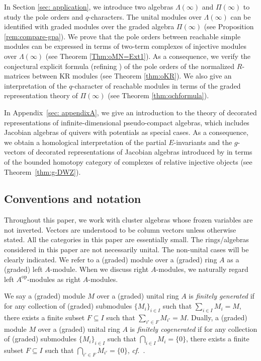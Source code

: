 \documentclass[12pt]{amsart}
\theoremstyle{definition}
\theoremstyle{remark}
\numberwithin{equation}{section}
\newcommand{\confer}{\textit{cf.}\ }
\newcommand{\op}{\mathrm{op}}
\begin{document}
In Section \ref{sec: application}, we introduce two algebras $\Lambda(\infty)$ and $\Pi(\infty)$ to study the pole orders and $q$-characters. The unital modules over $\Lambda(\infty)$ can be identified with graded modules over the graded algebra $\Pi(\infty)$ (see Proposition \ref{rem:compare-gpa}). We prove that the pole orders between reachable simple modules can be expressed in terms of two-term complexes of injective modules over $\Lambda(\infty)$ (see Theorem \ref{Thm:oMN=Ext1}). As a consequence, we verify the conjectural explicit formula \cite[Conjecture 5.17]{FM} (refining \cite[Conjecture 6.7]{Fujita-Oh-2021}) of the pole orders of the normalized $R$-matrices between KR modules (see Theorem \ref{thm:oKR}).
 We also give an interpretation of the $q$-character of reachable modules in terms of the graded representation theory of $\Pi(\infty)$ (see Theorem \ref{thm:qchformula}).

In Appendix~\ref{sec: appendixA}, we give an introduction to the theory of decorated representations of infinite-dimensional pseudo-compact algebras, which includes Jacobian algebras of quivers with potentials as special cases.
As a consequence, we obtain a homological interpretation of the partial $E$-invariants and the $g$-vectors of decorated representations of Jacobian algebras introduced by \cite{DWZ10} in terms of the bounded homotopy category of complexes of relative injective objects (see Theorem~\ref{thm:g-DWZ}).

\subsection*{Conventions and notation}
Throughout this paper, we work with cluster algebras whose frozen variables are not inverted. Vectors are understood to be column vectors unless otherwise stated. All the categories in this paper are essentially small. The rings/algebras considered in this paper are not necessarily unital. The non-unital cases will be clearly indicated.
We refer to a (graded) module over a (graded) ring $A$ as a (graded) left $A$-module. When we discuss right $A$-modules, we naturally regard left $A^\op$-modules as right $A$-modules. 


We say a (graded) module $M$ over a (graded) unital ring $A$ is {\em finitely generated}  if for any collection of (graded) submodules $\{M_i\}_{i\in I}$ such that $\sum_{i\in I}M_i = M$, there exists a finite subset $F\subseteq I$ such that $\sum_{i'\in F}M_{i'} = M$.
Dually, a (graded) module $M$ over a (graded) unital ring $A$ is {\em finitely cogenerated} if for any collection of (graded) submodules $\{M_i\}_{i\in I}$ such that $\bigcap_{i\in I}M_i = \{0\}$, there exists a finite subset $F\subseteq I$ such that $\bigcap_{i'\in F}M_{i'} = \{0\}$, \confer \cite[\S 10]{AF92}.
\end{document}
